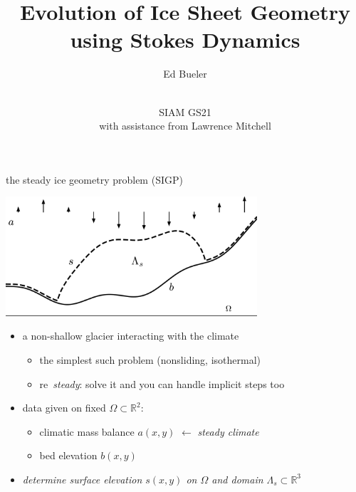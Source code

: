\documentclass{beamer}
\title{Evolution of Ice Sheet Geometry using Stokes Dynamics}
\author{Ed Bueler}
\institute{University of Alaska Fairbanks}
\date{\phantom{foo} \bigskip \bigskip \\ SIAM GS21 \\ with assistance from Lawrence Mitchell}
\newcommand{\RR}{\mathbb{R}}
\begin{document}
\begin{frame}
	\maketitle
\end{frame}


\begin{frame}{the steady ice geometry problem (SIGP)}

\vspace{-2mm}
\begin{center}
\includegraphics[width=0.7\textwidth]{figs/stokesdomain.png}
\end{center}

\vspace{-1mm}
\begin{itemize}
\item a non-shallow glacier interacting with the climate
    \begin{itemize}
    \item the simplest such problem (nonsliding, isothermal)
    \item re~\emph{steady}: solve it and you can handle implicit steps too
    \end{itemize}
\item data given on fixed $\Omega \subset \RR^2$:
    \begin{itemize}
    \item climatic mass balance $a(x,y)$ \hfill $\gets$ \emph{steady climate}
    \item bed elevation $b(x,y)$
    \end{itemize}
\item \emph{determine surface elevation $s(x,y)$ on $\Omega$ and domain $\Lambda_s \subset \RR^3$}
\end{itemize}
\end{frame}
\end{document}
